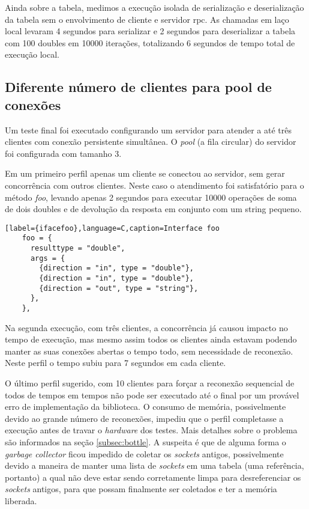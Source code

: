 \documentclass[11pt]{article}
\begin{document}
Ainda sobre a tabela, medimos a execução isolada de serialização e
deserialização da tabela sem o envolvimento de cliente e servidor \gls{rpc}. As
chamadas em laço local levaram 4 segundos para serializar e 2 segundos para
deserializar a tabela com 100 doubles em 10000 iterações, totalizando 6 segundos
de tempo total de execução local.

\subsection{Diferente número de clientes para pool de conexões}\label{subsec:diffpool}

Um teste final foi executado configurando um servidor para atender a até três
clientes com conexão persistente simultânea. O \textit{pool} (a fila circular)
do servidor foi configurada com tamanho 3.

Em um primeiro perfil apenas um cliente se conectou ao servidor, sem gerar
concorrência com outros clientes. Neste caso o atendimento foi satisfatório para
o método \textit{foo}, levando apenas 2 segundos para executar 10000 operações
de soma de dois doubles e de devolução da resposta em conjunto com um string
pequeno.

\begin{lstlisting}[label={ifacefoo},language=C,caption=Interface foo
    foo = {
      resulttype = "double",
      args = {
        {direction = "in", type = "double"},
        {direction = "in", type = "double"},
        {direction = "out", type = "string"},
      },
    },
\end{lstlisting}

Na segunda execução, com três clientes, a concorrência já causou impacto no
tempo de execução, mas mesmo assim todos os clientes ainda estavam podendo
manter as suas conexões abertas o tempo todo, sem necessidade de reconexão.
Neste perfil o tempo subiu para 7 segundos em cada cliente.

O último perfil sugerido, com 10 clientes para forçar a reconexão sequencial de
todos de tempos em tempos não pode ser executado até o final por um provável
erro de implementação da biblioteca. O consumo de memória, possivelmente devido
ao grande número de reconexões, impediu que o perfil completasse a execução
antes de travar o \textit{hardware} dos testes. Mais detalhes sobre o problema
são informados na seção \ref{subsec:bottle}. A suspeita é que de alguma forma o
\textit{garbage collector} ficou impedido de coletar os \textit{sockets}
antigos, possivelmente devido a maneira de manter uma lista de \textit{sockets}
em uma tabela (uma referência, portanto) a qual não deve estar sendo
corretamente limpa para desreferenciar os \textit{sockets} antigos, para que
possam finalmente ser coletados e ter a memória liberada.
\end{document}
